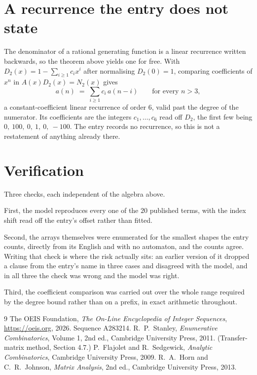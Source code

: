 \documentclass[11pt,a4paper]{article}
\theoremstyle{plain}
\theoremstyle{definition}
\begin{document}
\section{A recurrence the entry does not state}

The denominator of a rational generating function is a linear recurrence written backwards, so
the theorem above yields one for free. With $D_2(x)=1-\sum_{i\ge1}c_ix^i$ after normalising
$D_2(0)=1$, comparing coefficients of $x^n$ in $A(x)D_2(x)=N_2(x)$ gives
\[
a(n)\;=\;\sum_{i\ge1}c_i\,a(n-i)\qquad\text{for every }n>3,
\]
a constant-coefficient linear recurrence of order $6$, valid past the degree of the
numerator. Its coefficients are the integers $c_1,\dots,c_{6}$ read off $D_2$, the first few being $0,\ 100,\ 0,\ 1,\ 0,\ -100$. The entry records no recurrence, so this is not a restatement of anything
already there.

\section{Verification}

Three checks, each independent of the algebra above.

First, the model reproduces every one of the $20$ published terms, with the index shift
read off the entry's offset rather than fitted.

Second, the arrays themselves were enumerated for the smallest shapes the entry counts,
directly from its English and with no automaton, and the counts agree. Writing that check is
where the risk actually sits: an earlier version of it dropped a clause from the entry's name
in three cases and disagreed with the model, and in all three the check was wrong and the model
was right.

Third, the coefficient comparison was carried out over the whole range required by the degree
bound rather than on a prefix, in exact arithmetic throughout.

\begin{thebibliography}{9}
 The OEIS Foundation, \emph{The On-Line Encyclopedia of Integer
Sequences}, \url{https://oeis.org}, 2026. Sequence A283214.
 R.~P.~Stanley, \emph{Enumerative Combinatorics}, Volume 1, 2nd ed.,
Cambridge University Press, 2011. (Transfer-matrix method, Section 4.7.)
 P.~Flajolet and R.~Sedgewick, \emph{Analytic Combinatorics}, Cambridge
University Press, 2009.
 R.~A.~Horn and C.~R.~Johnson, \emph{Matrix Analysis}, 2nd ed., Cambridge
University Press, 2013.
\end{thebibliography}
\end{document}
